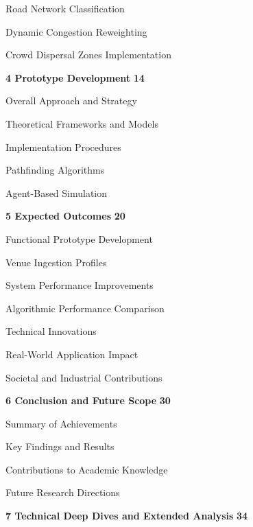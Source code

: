 \documentclass[12pt,a4paper,oneside]{report}
\begin{document}
\noindent{} \quad Road Network Classification 

\noindent{} \quad Dynamic Congestion Reweighting 

\noindent{} \quad Crowd Dispersal Zones Implementation 

\vspace{0.3cm}
\noindent\textbf{4 \quad Prototype Development} \dotfill \textbf{14}

\noindent{} \quad Overall Approach and Strategy 

\noindent{} \quad Theoretical Frameworks and Models 

\noindent{} \quad Implementation Procedures 

\noindent{} \quad Pathfinding Algorithms 

\noindent{} \quad Agent-Based Simulation 

\vspace{0.3cm}
\noindent\textbf{5 \quad Expected Outcomes} \dotfill \textbf{20}

\noindent{} \quad Functional Prototype Development 

\noindent{} \quad Venue Ingestion Profiles 

\noindent{} \quad System Performance Improvements 

\noindent{} \quad Algorithmic Performance Comparison 

\noindent{} \quad Technical Innovations 

\noindent{} \quad Real-World Application Impact 

\noindent{} \quad Societal and Industrial Contributions 

\vspace{0.3cm}
\noindent\textbf{6 \quad Conclusion and Future Scope} \dotfill \textbf{30}

\noindent{} \quad Summary of Achievements 

\noindent{} \quad Key Findings and Results 

\noindent{} \quad Contributions to Academic Knowledge 

\noindent{} \quad Future Research Directions 

\vspace{0.3cm}
\noindent\textbf{7 \quad Technical Deep Dives and Extended Analysis} \dotfill \textbf{34}
\end{document}
